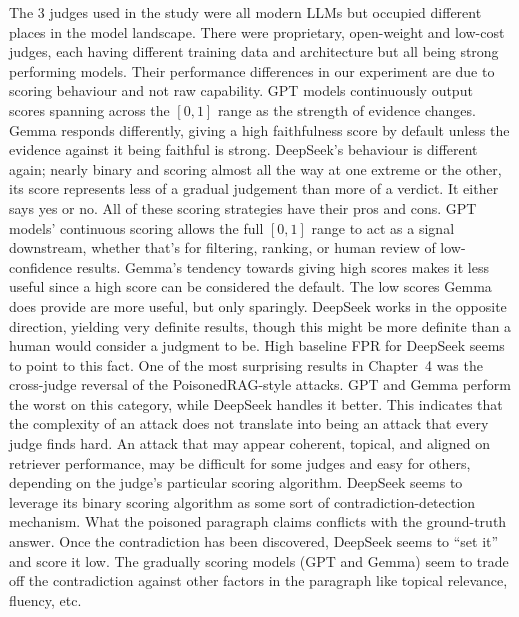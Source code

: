 The 3 judges used in the study were all modern LLMs but occupied different places in the model landscape. There were proprietary, open-weight and low-cost judges, each having different training data and architecture but all being strong performing models. Their performance differences in our experiment are due to scoring behaviour and not raw capability. GPT models continuously output scores spanning across the $[0,1]$ range as the strength of evidence changes. Gemma responds differently, giving a high faithfulness score by default unless the evidence against it being faithful is strong. DeepSeek's behaviour is different again; nearly binary and scoring almost all the way at one extreme or the other, its score represents less of a gradual judgement than more of a verdict. It either says yes or no.
All of these scoring strategies have their pros and cons. GPT models' continuous scoring allows the full $[0,1]$ range to act as a signal downstream, whether that's for filtering, ranking, or human review of low-confidence results. Gemma's tendency towards giving high scores makes it less useful since a high score can be considered the default. The low scores Gemma does provide are more useful, but only sparingly. DeepSeek works in the opposite direction, yielding very definite results, though this might be more definite than a human would consider a judgment to be. High baseline FPR for DeepSeek seems to point to this fact.
One of the most surprising results in Chapter~4 was the cross-judge reversal of the PoisonedRAG-style attacks. GPT and Gemma perform the worst on this category, while DeepSeek handles it better. This indicates that the complexity of an attack does not translate into being an attack that every judge finds hard. An attack that may appear coherent, topical, and aligned on retriever performance, may be difficult for some judges and easy for others, depending on the judge's particular scoring algorithm. DeepSeek seems to leverage its binary scoring algorithm as some sort of contradiction-detection mechanism. What the poisoned paragraph claims conflicts with the ground-truth answer. Once the contradiction has been discovered, DeepSeek seems to ``set it'' and score it low. The gradually scoring models (GPT and Gemma) seem to trade off the contradiction against other factors in the paragraph like topical relevance, fluency, etc.

